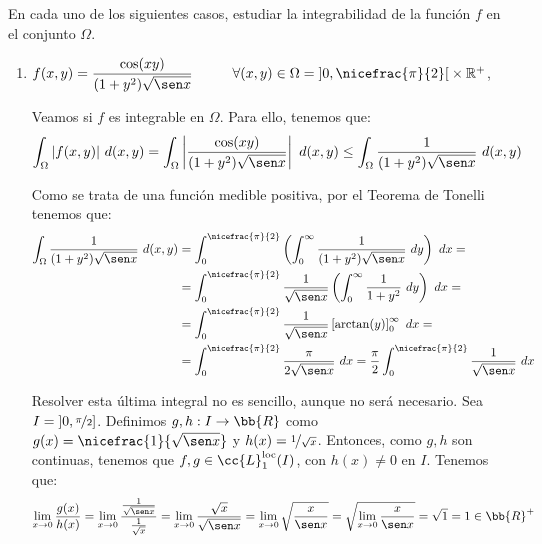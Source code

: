 \begin{ejercicio}
    En cada uno de los siguientes casos, estudiar la integrabilidad de la función \( f \) en el conjunto \( \Omega \).
    \begin{enumerate}
        \item $f(x, y) = \dfrac{\cos (x y)}{(1 + y^2) \sqrt{\sen x}} \hspace{1cm} \forall (x, y) \in \Omega= \left]0, \nicefrac{\pi}{2}\right[ \times \mathbb{R}^+$,
        
        Veamos si $f$ es integrable en $\Omega$. Para ello, tenemos que:
        \begin{equation*}
            \int_{\Omega} |f(x, y)|~d(x, y) = \int_{\Omega} \left| \dfrac{\cos (x y)}{(1 + y^2) \sqrt{\sen x}} \right|~d(x, y)
            \leq \int_{\Omega} \dfrac{1}{(1 + y^2) \sqrt{\sen x}}~d(x, y)
        \end{equation*}

        Como se trata de una función medible positiva, por el Teorema de Tonelli tenemos que:
        \begin{align*}
            \int_{\Omega} \dfrac{1}{(1 + y^2) \sqrt{\sen x}}~d(x, y)
            &= \int_{0}^{\nicefrac{\pi}{2}} \left( \int_{0}^{\infty} \dfrac{1}{(1 + y^2) \sqrt{\sen x}}~dy \right)~dx =\\
            &= \int_{0}^{\nicefrac{\pi}{2}} \frac{1}{\sqrt{\sen x}}\left( \int_{0}^{\infty} \dfrac{1}{1 + y^2}~dy \right)~dx =\\
            &= \int_{0}^{\nicefrac{\pi}{2}} \frac{1}{\sqrt{\sen x}}\left[ \arctan(y) \right]_{0}^{\infty}~dx =\\
            &= \int_{0}^{\nicefrac{\pi}{2}} \frac{\pi}{2\sqrt{\sen x}}~dx
            = \frac{\pi}{2}\int_{0}^{\nicefrac{\pi}{2}} \frac{1}{\sqrt{\sen x}}~dx
        \end{align*}

        Resolver esta última integral no es sencillo, aunque no será necesario. Sea $I=\left]0, \nicefrac{\pi}{2}\right]$. Definimos
        $g,h:I\to\bb{R}$ como $g(x)=\nicefrac{1}{\sqrt{\sen x}}$ y $h(x)=\nicefrac{1}{\sqrt{x}}$. Entonces, como $g,h$ son continuas,
        tenemos que $f,g\in \cc{L}_1^{\text{loc}}(I)$, con $h(x)\neq 0$ en $I$. Tenemos que:
        \begin{equation*}
            \lim_{x\to 0} \dfrac{g(x)}{h(x)} = \lim_{x\to 0} \dfrac{\frac{1}{\sqrt{\sen x}}}{\frac{1}{\sqrt{x}}} = \lim_{x\to 0} \dfrac{\sqrt{x}}{\sqrt{\sen x}}
            = \lim_{x\to 0} \sqrt{\dfrac{x}{\sen x}}
            = \sqrt{\lim_{x\to 0} \dfrac{x}{\sen x}} = \sqrt{1} = 1 \in \bb{R}^+
        \end{equation*}


\end{enumerate}
\end{ejercicio}
